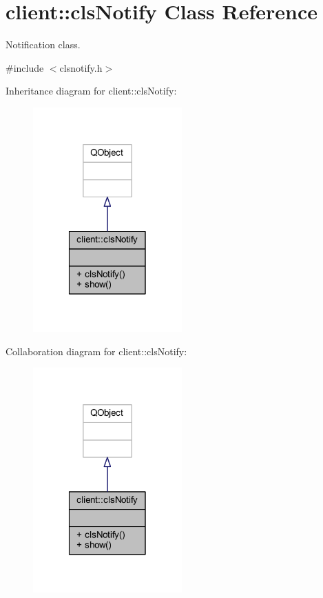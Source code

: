 \hypertarget{classclient_1_1cls_notify}{\section{client\-:\-:cls\-Notify Class Reference}
\label{dd/d69/classclient_1_1cls_notify}
}


Notification class.  




{\ttfamily \#include $<$clsnotify.\-h$>$}



Inheritance diagram for client\-:\-:cls\-Notify\-:\nopagebreak
\begin{figure}[H]
\begin{center}
\leavevmode
\includegraphics[width=162pt]{d3/ddf/classclient_1_1cls_notify__inherit__graph}
\end{center}
\end{figure}


Collaboration diagram for client\-:\-:cls\-Notify\-:\nopagebreak
\begin{figure}[H]
\begin{center}
\leavevmode
\includegraphics[width=162pt]{d9/deb/classclient_1_1cls_notify__coll__graph}
\end{center}
\end{figure}
